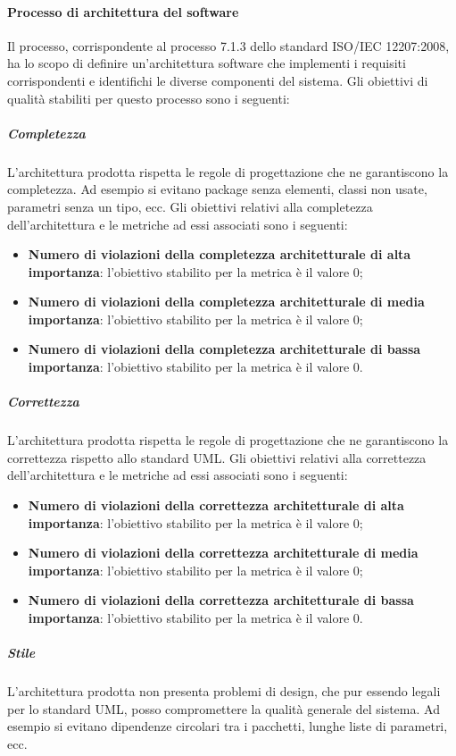 			\paragraph{Processo di architettura del software}
			Il processo, corrispondente al processo 7.1.3 dello standard ISO/IEC 12207:2008, ha lo scopo di definire un'architettura software che implementi i requisiti corrispondenti e identifichi le diverse componenti del sistema.
			Gli obiettivi di qualità stabiliti per questo processo sono i seguenti:
				\subparagraph{Completezza}
				L'architettura prodotta rispetta le regole di progettazione che ne garantiscono la completezza. Ad esempio si evitano package senza elementi, classi non usate, parametri senza un tipo, ecc.
				Gli obiettivi relativi alla completezza dell'architettura e le metriche ad essi associati sono i seguenti:
		 		\begin{itemize}
					\item \textbf{Numero di violazioni della completezza architetturale di alta importanza}: l'obiettivo stabilito per la metrica è il valore 0;
					\item \textbf{Numero di violazioni della completezza architetturale di media importanza}: l'obiettivo stabilito per la metrica è il valore 0;
					\item \textbf{Numero di violazioni della completezza architetturale di bassa importanza}: l'obiettivo stabilito per la metrica è il valore 0.
				\end{itemize}
				\subparagraph{Correttezza}
				L'architettura prodotta rispetta le regole di progettazione che ne garantiscono la correttezza rispetto allo standard UML.
				Gli obiettivi relativi alla correttezza dell'architettura e le metriche ad essi associati sono i seguenti:
		 		\begin{itemize}
					\item \textbf{Numero di violazioni della correttezza architetturale di alta importanza}: l'obiettivo stabilito per la metrica è il valore 0;
					\item \textbf{Numero di violazioni della correttezza architetturale di media importanza}: l'obiettivo stabilito per la metrica è il valore 0;
					\item \textbf{Numero di violazioni della correttezza architetturale di bassa importanza}: l'obiettivo stabilito per la metrica è il valore 0.
				\end{itemize}
				\subparagraph{Stile}
				L'architettura prodotta non presenta problemi di design, che pur essendo legali per lo standard UML, posso compromettere la qualità generale del sistema. Ad esempio si evitano dipendenze circolari tra i pacchetti, lunghe liste di parametri, ecc.
